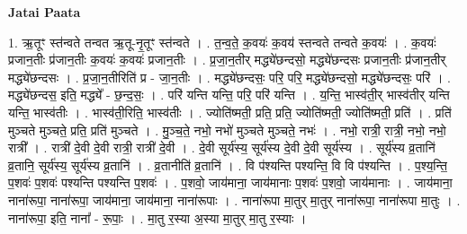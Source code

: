 \documentclass[17pt]{extarticle}
\begin{document}
\textbf{Jatai Paata} \newline

1. ऋ॒तूꣳ स्त॑न्वते तन्वत ऋ॒तू-नृ॒तूꣳ स्त॑न्वते । . त॒न्व॒ते॒ क॒वयः॑ क॒वय॑ स्तन्वते तन्वते क॒वयः॑ । . क॒वयः॑ प्रजान॒तीः प्र॑जान॒तीः क॒वयः॑ क॒वयः॑ प्रजान॒तीः । . प्र॒जा॒न॒तीर् मद्ध्ये॑छन्दसो॒ मद्ध्ये॑छन्दसः प्रजान॒तीः प्र॑जान॒तीर् मद्ध्ये॑छन्दसः । . प्र॒जा॒न॒तीरिति॑ प्र - जा॒न॒तीः । . मद्ध्ये॑छन्दसः॒ परि॒ परि॒ मद्ध्ये॑छन्दसो॒ मद्ध्ये॑छन्दसः॒ परि॑ । . मद्ध्ये॑छन्दस॒ इति॒ मद्ध्ये᳚ - छ॒न्द॒सः॒ । . परि॑ यन्ति यन्ति॒ परि॒ परि॑ यन्ति । . य॒न्ति॒ भास्व॑ती॒र् भास्व॑तीर् यन्ति यन्ति॒ भास्व॑तीः । . भास्व॑ती॒रिति॒ भास्व॑तीः । . ज्योति॑ष्मती॒ प्रति॒ प्रति॒ ज्योति॑ष्मती॒ ज्योति॑ष्मती॒ प्रति॑ । . प्रति॑ मुञ्चते मुञ्चते॒ प्रति॒ प्रति॑ मुञ्चते । . मु॒ञ्च॒ते॒ नभो॒ नभो॑ मुञ्चते मुञ्चते॒ नभः॑ । . नभो॒ रात्री॒ रात्री॒ नभो॒ नभो॒ रात्री᳚ । . रात्री॑ दे॒वी दे॒वी रात्री॒ रात्री॑ दे॒वी । . दे॒वी सूर्य॑स्य॒ सूर्य॑स्य दे॒वी दे॒वी सूर्य॑स्य । . सूर्य॑स्य व्र॒तानि॑ व्र॒तानि॒ सूर्य॑स्य॒ सूर्य॑स्य व्र॒तानि॑ । . व्र॒तानीति॑ व्र॒तानि॑ । . वि प॑श्यन्ति पश्यन्ति॒ वि वि प॑श्यन्ति । . प॒श्य॒न्ति॒ प॒शवः॑ प॒शवः॑ पश्यन्ति पश्यन्ति प॒शवः॑ । . प॒शवो॒ जाय॑माना॒ जाय॑मानाः प॒शवः॑ प॒शवो॒ जाय॑मानाः । . जाय॑माना॒ नाना॑रूपा॒ नाना॑रूपा॒ जाय॑माना॒ जाय॑माना॒ नाना॑रूपाः । . नाना॑रूपा मा॒तुर् मा॒तुर् नाना॑रूपा॒ नाना॑रूपा मा॒तुः । . नाना॑रूपा॒ इति॒ नाना᳚ - रू॒पाः॒ । . मा॒तु र॒स्या अ॒स्या मा॒तुर् मा॒तु र॒स्याः । \newline
\end{document}
